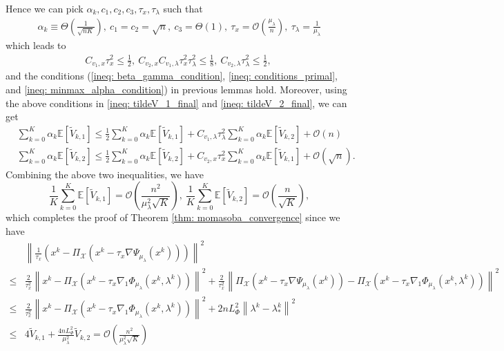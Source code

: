 \documentclass[10pt]{article}
\theoremstyle{remark}
\newcommand{\cO}{\mathcal{O}}
\newcommand{\cX}{\mathcal{X}}
\newcommand{\E}{\mathbb{E}}
\newcommand{\norm}[1]{\left\|#1\right\|}
\begin{document}
Hence we can pick $\alpha_k, c_1, c_2, c_3, \tau_x, \tau_{\lambda}$ such that
\begin{align*}
    \alpha_k \equiv \Theta\left(\frac{1}{\sqrt{nK}}\right),\ c_1 = c_2 = \sqrt{n},\ c_3 = \Theta(1),\ \tau_x = \cO\left(\frac{\mu_{\lambda}}{n}\right),\ \tau_{\lambda} = \frac{1}{\mu_{\lambda}}
\end{align*}
which leads to
\begin{align*}
    C_{v_1, x}\tau_x^2 \leq \frac{1}{2},\ C_{v_2, x}C_{v_1,\lambda}\tau_x^2\tau_{\lambda}^2\leq \frac{1}{8},\ C_{v_2, \lambda}\tau_{\lambda}^2\leq \frac{1}{2},\ 
\end{align*}
and the conditions (\eqref{ineq: beta_gamma_condition}, \eqref{ineq: conditions_primal}, and \eqref{ineq: minmax_alpha_condition}) in previous lemmas hold. Moreover, using the above conditions in \eqref{ineq: tildeV_1_final} and \eqref{ineq: tildeV_2_final}, we can get
\begin{align*}
    &\sum_{k=0}^{K}\alpha_k\E\left[\tilde V_{k,1}\right]\leq \frac{1}{2}\sum_{k=0}^{K}\alpha_k\E\left[\tilde V_{k,1}\right] + C_{v_1,\lambda}\tau_{\lambda}^2\sum_{k=0}^{K}\alpha_k\E\left[\tilde V_{k,2}\right] + \cO\left(n\right)\\
    &\sum_{k=0}^{K}\alpha_k\E\left[\tilde V_{k,2}\right]\leq \frac{1}{2}\sum_{k=0}^{K}\alpha_k\E\left[\tilde V_{k,2}\right] + C_{v_2,x}\tau_x^2\sum_{k=0}^{K}\alpha_k\E\left[\tilde V_{k,1}\right] + \cO\left(\sqrt{n}\right).
\end{align*}
Combining the above two inequalities, we have
\[
    \frac{1}{K}\sum_{k=0}^{K}\E\left[\tilde V_{k,1}\right] = \cO\left(\frac{n^2}{\mu_{\lambda}^2\sqrt{K}}\right),\ \frac{1}{K}\sum_{k=0}^{K}\E\left[\tilde V_{k,2}\right] = \cO\left(\frac{n}{\sqrt{K}}\right),
\]
which completes the proof of Theorem \ref{thm: momasoba_convergence} since we have
\begin{align*}
    &\norm{\frac{1}{\tau_x}\left(x^k - \Pi_{\cX}\left(x^k - \tau_x\nabla\Psi_{\mu_{\lambda}}(x^k)\right) \right)}^2\\
    \leq &\frac{2}{\tau_x^2}\norm{x^k - \Pi_{\cX}\left(x^k - \tau_x\nabla_1\Phi_{\mu_{\lambda}}(x^k, \lambda^k)\right) }^2 + \frac{2}{\tau_x^2}\norm{\Pi_{\cX}\left(x^k - \tau_x\nabla\Psi_{\mu_{\lambda}}(x^k)\right) - \Pi_{\cX}\left(x^k - \tau_x\nabla_1\Phi_{\mu_{\lambda}}(x^k, \lambda^k)\right) }^2 \\
    \leq &\frac{2}{\tau_x^2}\norm{x^k - \Pi_{\cX}\left(x^k - \tau_x\nabla_1\Phi_{\mu_{\lambda}}(x^k, \lambda^k)\right) }^2 + 2nL_{\Phi}^2\norm{\lambda^k - \lambda_*^k}^2 \\
    \leq & 4\tilde V_{k,1} + \frac{4nL_{\Phi}^2}{\mu_{\lambda}^2}\tilde V_{k,2} = \cO\left(\frac{n^2}{\mu_{\lambda}^2\sqrt{K}}\right)
\end{align*}
\end{document}

